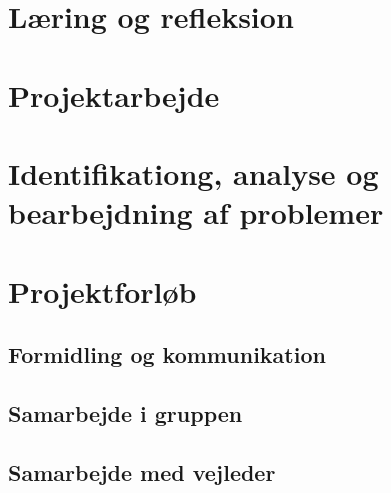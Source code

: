\setcounter{page}{1}

\section{Læring og refleksion}




\section{Projektarbejde}




\section{Identifikationg, analyse og bearbejdning af problemer}





\section{Projektforløb}



\subsection{Formidling og kommunikation}





\subsection{Samarbejde i gruppen}






\subsection{Samarbejde med vejleder}






